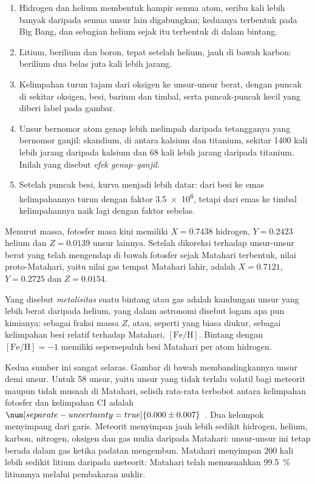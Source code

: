 \begin{enumerate}
\item Hidrogen dan helium membentuk hampir semua atom, seribu kali
  lebih banyak daripada semua unsur lain digabungkan; keduanya terbentuk pada Big Bang, dan
  sebagian helium sejak itu terbentuk di dalam bintang.
\item Litium, berilium dan boron, tepat setelah helium, jauh di bawah
  karbon: berilium dua belas juta kali lebih jarang.
\item Kelimpahan turun tajam dari oksigen ke unsur-unsur berat, dengan
  puncak di sekitar oksigen, besi, barium dan timbal, serta
  puncak-puncak kecil yang diberi label pada gambar.
\item Unsur bernomor atom genap lebih melimpah daripada tetangganya
  yang bernomor ganjil: skandium, di antara kalsium dan titanium, sekitar \num{1400}
  kali lebih jarang daripada kalsium dan \num{68} kali lebih jarang daripada titanium. Inilah
  yang disebut \emph{efek genap--ganjil}.
\item Setelah puncak besi, kurva menjadi lebih datar: dari besi ke emas
  kelimpahannya turun dengan faktor \num{3.5e6}, tetapi dari emas ke timbal
  kelimpahannya naik lagi dengan faktor sebelas.
\end{enumerate}

Menurut massa, fotosfer masa kini memiliki $X = 0.7438$ hidrogen,
$Y = 0.2423$ helium dan $Z = 0.0139$ unsur lainnya. Setelah dikoreksi
terhadap unsur-unsur berat yang telah mengendap di bawah fotosfer sejak Matahari
terbentuk, nilai proto-Matahari, yaitu nilai gas tempat Matahari lahir,
adalah $X = 0.7121$, $Y = 0.2725$ dan $Z = 0.0154$.

\begin{definition}[Metalisitas]\label{def:b3:origin-of-elements:metallicity}
Yang disebut \emph{metalisitas} suatu bintang atau gas adalah
kandungan unsur yang lebih berat daripada helium, yang dalam astronomi disebut
logam apa pun kimianya: sebagai fraksi massa $Z$, atau, seperti yang biasa diukur,
sebagai kelimpahan besi relatif terhadap Matahari, $[\mathrm{Fe/H}]$.
Bintang dengan $[\mathrm{Fe/H}] = -1$ memiliki sepersepuluh besi Matahari per
atom hidrogen.
\end{definition}

Kedua sumber  ini sangat selaras. Gambar di bawah
membandingkannya unsur demi unsur. Untuk 58 unsur, yaitu unsur yang
tidak terlalu volatil bagi meteorit maupun tidak musnah di Matahari, selisih
rata-rata terbobot antara kelimpahan fotosfer dan kelimpahan CI
adalah $\num[separate-uncertainty=true]{0.000 \pm 0.007}$~. Dua kelompok
menyimpang dari garis. Meteorit menyimpan jauh lebih sedikit hidrogen, helium,
karbon, nitrogen, oksigen dan gas mulia daripada Matahari: unsur-unsur ini
tetap berada dalam gas ketika padatan mengembun. Matahari menyimpan
\num{200} kali lebih sedikit litium daripada meteorit: Matahari telah memusnahkan
\qty{99.5}{\percent} litiumnya melalui pembakaran nuklir.

